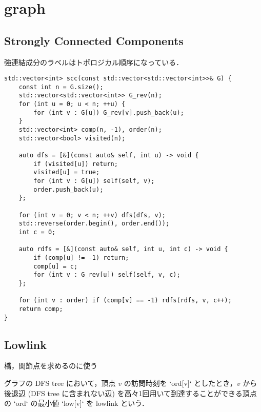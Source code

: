 \section{graph}

\subsection{Strongly Connected Components}

\begin{small}
強連結成分のラベルはトポロジカル順序になっている．
\end{small}

\begin{lstlisting}
std::vector<int> scc(const std::vector<std::vector<int>>& G) {
    const int n = G.size();
    std::vector<std::vector<int>> G_rev(n);
    for (int u = 0; u < n; ++u) {
        for (int v : G[u]) G_rev[v].push_back(u);
    }
    std::vector<int> comp(n, -1), order(n);
    std::vector<bool> visited(n);

    auto dfs = [&](const auto& self, int u) -> void {
        if (visited[u]) return;
        visited[u] = true;
        for (int v : G[u]) self(self, v);
        order.push_back(u);
    };

    for (int v = 0; v < n; ++v) dfs(dfs, v);
    std::reverse(order.begin(), order.end());
    int c = 0;

    auto rdfs = [&](const auto& self, int u, int c) -> void {
        if (comp[u] != -1) return;
        comp[u] = c;
        for (int v : G_rev[u]) self(self, v, c);
    };

    for (int v : order) if (comp[v] == -1) rdfs(rdfs, v, c++);
    return comp;
}
\end{lstlisting}

\subsection{Lowlink}

\begin{small}
\begin{markdown}
橋，関節点を求めるのに使う

グラフの DFS tree において，頂点 $v$ の訪問時刻を `ord[v]` としたとき，$v$ から後退辺 (DFS tree に含まれない辺) を高々1回用いて到達することができる頂点の `ord` の最小値 `low[v]` を lowlink という．
\end{markdown}
\end{small}

